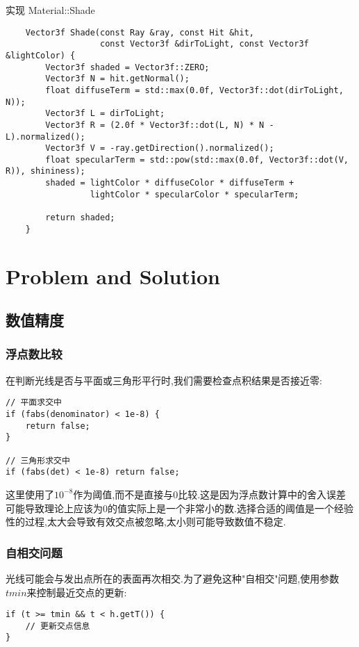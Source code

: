 \documentclass[a4paper,twoside]{article}
\begin{document}
\begin{listing}[H]
    \caption{实现 Material::Shade}
    \label{code:material_shade}
    \begin{verbatim}
    Vector3f Shade(const Ray &ray, const Hit &hit,
                   const Vector3f &dirToLight, const Vector3f &lightColor) {
        Vector3f shaded = Vector3f::ZERO;
        Vector3f N = hit.getNormal();
        float diffuseTerm = std::max(0.0f, Vector3f::dot(dirToLight, N));
        Vector3f L = dirToLight;
        Vector3f R = (2.0f * Vector3f::dot(L, N) * N - L).normalized();
        Vector3f V = -ray.getDirection().normalized();
        float specularTerm = std::pow(std::max(0.0f, Vector3f::dot(V, R)), shininess);
        shaded = lightColor * diffuseColor * diffuseTerm + 
                 lightColor * specularColor * specularTerm;
        
        return shaded;
    }
    \end{verbatim}
\end{listing}

\section{Problem and Solution}

\subsection{数值精度}

\subsubsection{浮点数比较}
在判断光线是否与平面或三角形平行时,我们需要检查点积结果是否接近零:
\begin{verbatim}
// 平面求交中
if (fabs(denominator) < 1e-8) {
    return false;
}

// 三角形求交中
if (fabs(det) < 1e-8) return false;
\end{verbatim}

这里使用了$10^{-8}$作为阈值,而不是直接与0比较.这是因为浮点数计算中的舍入误差可能导致理论上应该为0的值实际上是一个非常小的数.选择合适的阈值是一个经验性的过程,太大会导致有效交点被忽略,太小则可能导致数值不稳定.

\subsubsection{自相交问题}
光线可能会与发出点所在的表面再次相交.为了避免这种"自相交"问题,使用参数$tmin$来控制最近交点的更新:
\begin{verbatim}
if (t >= tmin && t < h.getT()) {
    // 更新交点信息
}
\end{verbatim}
\end{document}
